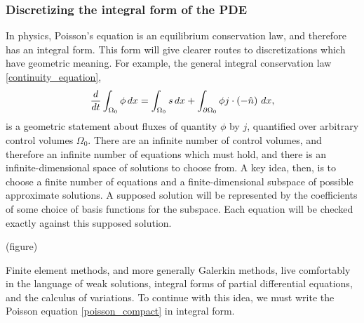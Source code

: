 
\subsubsection{Discretizing the integral form of the PDE}
In physics, Poisson's equation is an equilibrium conservation law, and therefore has an integral form.
This form will give clearer routes to discretizations which
have geometric meaning.
For example, the general integral conservation law \eqref{continuity_equation},
\begin{align*}
    \frac{d}{dt} \int_{\Omega_0} \phi\,dx = \int_{\Omega_0} s\,dx + \int_{{\partial\Omega_0}} \phi j \cdot \left(-\hat{n}\right)\,dx,
\end{align*}
is a geometric statement about fluxes
of quantity $\phi$ by $j$, quantified over arbitrary control volumes $\Omega_0$.
There are an infinite number of control volumes, and therefore an infinite number of equations which must hold, and there is an infinite-dimensional
space of solutions to choose from. A key idea, then, is to choose a finite number of equations and a finite-dimensional subspace of possible approximate solutions.
A supposed solution will be represented by the coefficients of some choice of basis functions for the subspace. Each equation will be checked exactly against this supposed solution.

\vskip 0.2in
(figure)
\vskip 0.2in

Finite element methods, and more generally Galerkin methods, live comfortably in the language of weak solutions, integral forms of partial differential equations,
and the calculus of variations.
To continue with this idea, we must write the Poisson equation \eqref{poisson_compact} in integral form.

